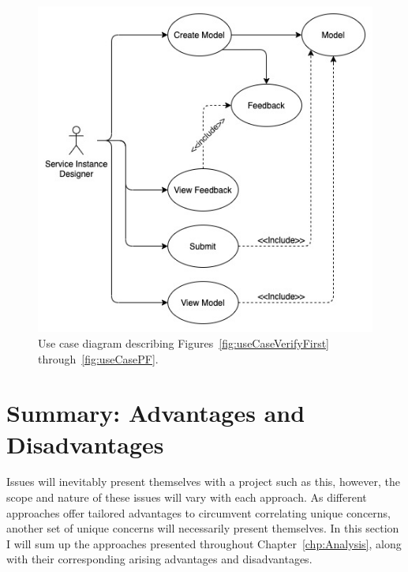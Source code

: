 \begin{figure}[h]
  \centering
  \includegraphics[width=0.8\linewidth]{figures/UCD.jpg}
  \caption{Use case diagram describing Figures~\ref{fig:useCaseVerifyFirst} through~\ref{fig:useCasePF}.}
  \label{fig:useCaseDiagram}
\end{figure}
\section{Summary: Advantages and Disadvantages} 
Issues will inevitably present themselves with a project such as this, however, the scope and nature of these issues will vary with each approach. As different approaches offer tailored advantages to circumvent correlating unique concerns, another set of unique concerns will necessarily present themselves. In this section I will sum up the approaches presented throughout Chapter~\ref{chp:Analysis}, along with their corresponding arising advantages and disadvantages.
